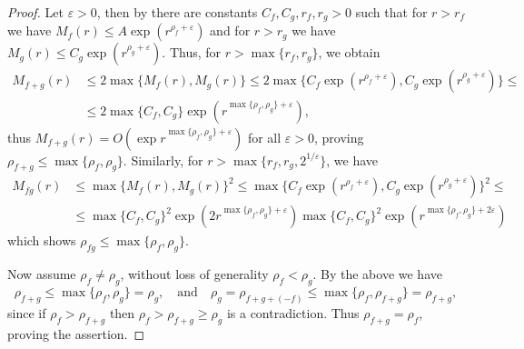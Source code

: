 \begin{proof}
    Let $\varepsilon > 0$, then by  there are constants $C_f, C_g, r_f, r_g > 0$ such that for $r > r_f$ we have $M_f(r) \leq A \exp(r^{\rho_f + \varepsilon})$ and for $r > r_g$ we have $M_g(r) \leq C_g \exp(r^{\rho_g + \varepsilon})$. Thus, for $r > \max \{ r_f, r_g \}$, we obtain
    \begin{align*}
        M_{f + g}(r) &\leq 2 \max \{ M_f(r), M_g(r) \} \leq 2 \max \{ C_f \exp (r^{\rho_f + \varepsilon} ), C_g \exp (r^{\rho_g + \varepsilon} ) \} \leq \\
        &\leq 2 \max \{ C_f, C_g \} \exp (r^{\max \{ \rho_f, \rho_g \} + \varepsilon}),
    \end{align*}
    thus $M_{f + g}(r) = O(\exp r^{\max \{ \rho_f, \rho_g \} + \varepsilon})$ for all $\varepsilon > 0$, proving $\rho_{f + g} \leq \max \{ \rho_f, \rho_g \}$. Similarly, for $r > \max \{ r_f, r_g, 2^{1/\varepsilon} \}$, we have
    \begin{align*}
        M_{fg}(r) &\leq \max \{ M_f(r), M_g(r) \}^2 \leq \max \{ C_f \exp (r^{\rho_f + \varepsilon} ), C_g \exp (r^{\rho_g + \varepsilon} ) \}^2 \leq \\
        &\leq \max \{ C_f, C_g \}^2 \exp (2 r^{ \max \{ \rho_f, \rho_g \} + \varepsilon}) \max \{ C_f, C_g \}^2 \exp (r^{ \max \{ \rho_f, \rho_g \} + 2\varepsilon})
    \end{align*}
    which shows $\rho_{fg} \leq \max \{ \rho_f, \rho_g \}$.

    Now assume $\rho_f \neq \rho_g$, without loss of generality $\rho_f < \rho_g$. By the above we have
    \begin{equation*}
        \rho_{f+g} \leq \max \{ \rho_f, \rho_g \} = \rho_g, \quad\textrm{and}\quad \rho_g = \rho_{f+g+(-f)} \leq \max \{ \rho_f, \rho_{f+g} \} = \rho_{f+g},
    \end{equation*}
    since if $\rho_f > \rho_{f+g}$ then $\rho_f > \rho_{f+g} \geq \rho_g$ is a contradiction. Thus $\rho_{f+g} = \rho_f$, proving the assertion.


\end{proof}
